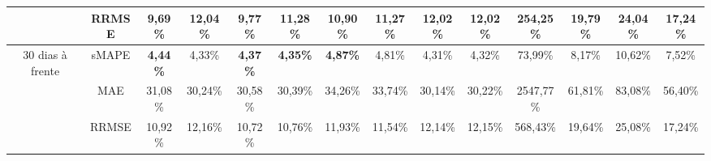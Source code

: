 \begin{landscape}
\begin{table}[!htpb]
\begin{tabular}{@{}cccccccccccccc@{}}
	& RRMSE    & 9,69\%          & 12,04\% & 9,77\%          & 11,28\%         & 10,90\%         & 11,27\%         & 12,02\% & 12,02\% & 254,25\%        & 19,79\% & 24,04\% & 17,24\% \\ \midrule
	\multirow{3}{*}{30 dias à frente} & sMAPE    & \textbf{4,44\%} & 4,33\%  & \textbf{4,37\%} & \textbf{4,35\%} & \textbf{4,87\%} & 4,81\%          & 4,31\%  & 4,32\%  & 73,99\%         & 8,17\%  & 10,62\% & 7,52\%  \\
	& MAE      & 31,08\%         & 30,24\% & 30,58\%         & 30,39\%         & 34,26\%         & 33,74\%         & 30,14\% & 30,22\% & 2547,77\%       & 61,81\% & 83,08\% & 56,40\% \\
	& RRMSE    & 10,92\%         & 12,16\% & 10,72\%         & 10,76\%         & 11,93\%         & 11,54\%         & 12,14\% & 12,15\% & 568,43\%        & 19,64\% & 25,08\% & 17,24\% \\ \cmidrule(l){1-14} 
\end{tabular}
	
\end{table}

\newpage


\end{landscape}
